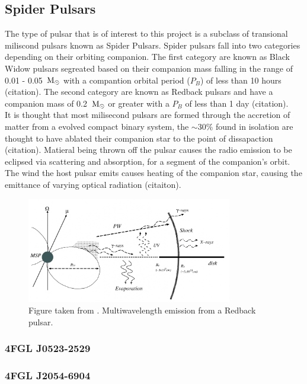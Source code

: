 \subsection{Spider Pulsars}

The type of pulsar that is of interest to this project is a subclass of transional miliscond pulsars known as Spider Pulsars. Spider pulsars fall into two categories depending on their orbiting companion. The first category are known as Black Widow pulsars segreated based on their companion mass falling in the range of 0.01 - 0.05 $\, \text{M}_\odot$ with a compantion orbital period ($P_B$) of less than 10 hours (citation). The second category are known as Redback pulsars and have a companion mass of 0.2 $\, \text{M}_\odot$ or greater with a $P_B$ of less than 1 day (citation). \\ 

It is thought that most milisecond pulsars are formed through the accretion of matter from a evolved compact binary system, the $\sim 30\%$ found in isolation are thought to have ablated their companion star to the point of dissapaction (citation). Matieral being thrown off the pulsar causes the radio emission to be eclipsed via scattering and absorption, for a segment of the companion's orbit. \\ 

The wind the host pulsar emits causes heating of the companion star, causing the emittance of varying optical radiation (citaiton). 

\begin{figure}
    \centering
    \includegraphics[width=0.8\textwidth]{figs/theory/redback-multiwavelength-emission.jpg}
    \caption{Figure taken from \cite{takata_multi-wavelength_2014}. Multiwavelength emission from a Redback pulsar.}
\end{figure}

\subsubsection{4FGL J0523-2529}

\subsubsection{4FGL J2054-6904}